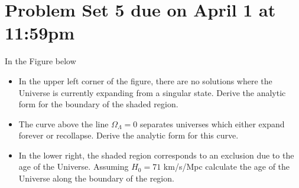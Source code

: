 \section*{Problem Set 5 due on April 1 at 11:59pm}

In the Figure below 

\begin{itemize}
    \item [(a)]In the upper left corner of the figure, there are no solutions where the Universe is currently expanding from a singular state. Derive the analytic form for the boundary of the shaded region.
    \item [(b)] The curve above the line $\Omega_\Lambda = 0$ separates universes which either expand forever or recollapse. Derive the analytic form for this curve.
    \item [(c)] In the lower right, the shaded region corresponds to an exclusion due to the age of the Universe. Assuming $H_0 = 71$ km/s/Mpc calculate the age of the Universe along the boundary of the region.
\end{itemize}


